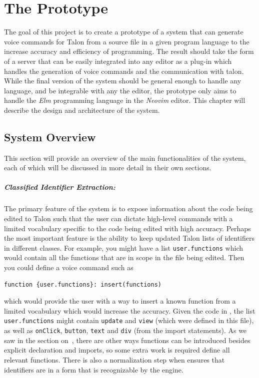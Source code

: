 \documentclass[../thesis.tex]{subfiles}
\begin{document}
\chapter{The Prototype}\label{the_project}
The goal of this project is to create a prototype of a system that can generate voice commands
for Talon from a source file in a given program language to the increase accuracy and efficiency of programming.
The result should take the form of a server that can be easily integrated into any editor as a plug-in
which handles the generation of voice commands and the communication with talon.
While the final version of the system should be general enough to handle any language, and be integrable with any the editor,
the prototype only aims to handle the \textit{Elm} programming language in the \textit{Neovim} editor.
This chapter will describe the design and architecture of the system.

\section{System Overview}%
\label{sec:voice_command_generation}
This section will provide an overview of the main functionalities of the system,
each of which will be discussed in more detail in their own sections.

\paragraph{Classified Identifier Extraction:}%
\label{par:classified_identifier_extraction}
The primary feature of the system is to expose information about the code being edited
to Talon such that the user can dictate high-level commands with a limited vocabulary
specific to the code being edited with high accuracy.
Perhaps the most important feature is the ability to keep updated Talon lists
of identifiers in different classes. For example, you might have a list \texttt{user.functions} which would contain
all the functions that are in scope in the file being edited.
Then you could define a voice command such as 
\begin{verbatim}
function {user.functions}: insert(functions)
\end{verbatim} 
which would provide the user with a way to insert a known function from a limited vocabulary which would increase the accuracy.
Given the code in , the list \texttt{user.functions} might contain \texttt{update} and \texttt{view}
(which were defined in this file), as well as \texttt{onClick}, \texttt{button}, \texttt{text} and \texttt{div} (from the import statements).
As we saw in the section on~, there are other ways functions can be introduced
besides explicit declaration and imports, so some extra work is required define all relevant functions.
There is also a normalization step when ensures that identifiers are in a form that is recognizable by the engine.
\end{document}
